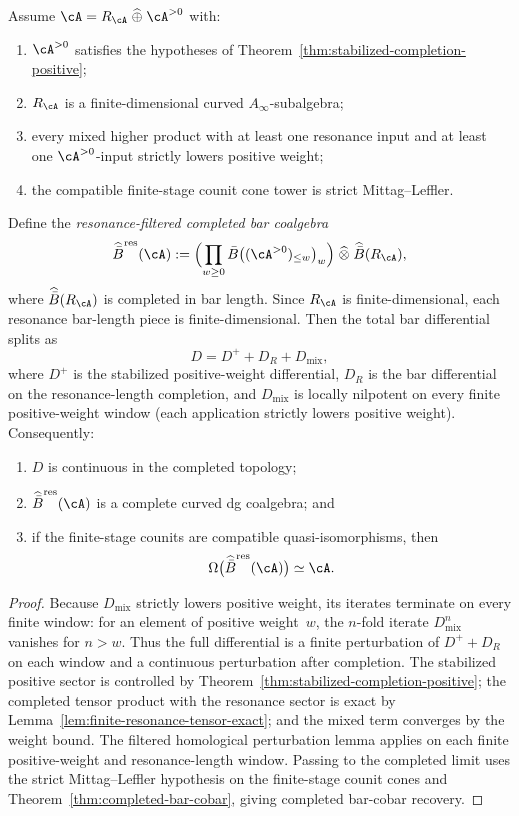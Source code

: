 \begin{theorem}
\label{thm:resonance-filtered-bar-cobar}
Assume $\cA = R_\cA \;\widehat{\oplus}\; \cA^{>0}$ with:
\begin{enumerate}
\item $\cA^{>0}$ satisfies the hypotheses of
 Theorem~\textup{\ref{thm:stabilized-completion-positive}};
\item $R_\cA$ is a finite-dimensional curved $A_\infty$-subalgebra;
\item every mixed higher product with at least one resonance input and
 at least one $\cA^{>0}$-input strictly lowers positive weight;
\item the compatible finite-stage counit cone tower is strict
 Mittag--Leffler.
\end{enumerate}
Define the \emph{resonance-filtered completed bar coalgebra}
\[
\widehat{\bar B}^{\mathrm{res}}(\cA)
:=
\Bigl(\prod_{w \ge 0}
 \bar B\bigl((\cA^{>0})_{\le w}\bigr)_w\Bigr)
\;\widehat{\otimes}\;
\widehat{\bar B}(R_\cA),
\]
where $\widehat{\bar B}(R_\cA)$ is completed in bar length.  Since
$R_\cA$ is finite-dimensional, each resonance bar-length piece is
finite-dimensional.
Then the total bar differential splits as
\[
D = D^+ + D_R + D_{\mathrm{mix}},
\]
where $D^+$ is the stabilized positive-weight differential,
$D_R$ is the bar differential on the resonance-length completion, and
$D_{\mathrm{mix}}$ is
locally nilpotent on every finite positive-weight window
\textup{(}each application strictly lowers positive weight\textup{)}.
Consequently:
\begin{enumerate}
\item $D$ is continuous in the completed topology;
\item $\widehat{\bar B}^{\mathrm{res}}(\cA)$ is a complete
 curved dg coalgebra; and
\item if the finite-stage counits are compatible quasi-isomorphisms,
 then
 \[
 \Omega\bigl(\widehat{\bar B}^{\mathrm{res}}(\cA)\bigr)
 \simeq \cA.
 \]
\end{enumerate}
\end{theorem}

\begin{proof}
Because $D_{\mathrm{mix}}$ strictly lowers positive weight, its
iterates terminate on every finite window: for an element of
positive weight~$w$, the $n$-fold iterate $D_{\mathrm{mix}}^n$
vanishes for $n > w$. Thus the full differential is a finite
perturbation of $D^+ + D_R$ on each window and a continuous
perturbation after completion. The stabilized positive sector is
controlled by Theorem~\ref{thm:stabilized-completion-positive};
the completed tensor product with the resonance sector is exact by
Lemma~\ref{lem:finite-resonance-tensor-exact}; and the mixed term
converges by the weight bound. The filtered homological perturbation
lemma applies on each finite positive-weight and resonance-length
window.  Passing to the completed limit uses the strict
Mittag--Leffler hypothesis on the finite-stage counit cones and
Theorem~\ref{thm:completed-bar-cobar}, giving completed bar-cobar
recovery.
\end{proof}

